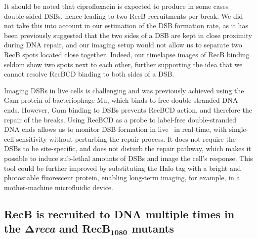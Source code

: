 It should be noted that ciprofloxacin is expected to produce in some cases double-sided DSBs, hence leading to two RecB recruitments per break. We did not take this into account in our estimation of the DSB formation rate, as it has been previously suggested that the two sides of a DSB are kept in close proximity during DNA repair\cite{Vickridge2017,Keyamura2019}, and our imaging setup would not allow us to separate two RecB spots located close together. Indeed, our timelapse images of RecB binding seldom show two spots next to each other, further supporting the idea that we cannot resolve RecBCD binding to both sides of a DSB.

Imaging DSBs in live cells is challenging and was previously achieved using the Gam protein of bacteriophage Mu, which binds to free double-stranded DNA ends\cite{Shee2013}. However, Gam binding to DSBs prevents RecBCD action, and therefore the repair of the breaks. Using RecBCD as a probe to label-free double-stranded DNA ends allows us to monitor DSB formation in live \ecoli\ in real-time, with single-cell sensitivity without perturbing the repair process. It does not require the DSBs to be site-specific, and does not disturb the repair pathway, which makes it possible to induce sub-lethal amounts of DSBs and image the cell's response. This tool could be further improved by substituting the Halo tag with a bright and photostable fluorescent protein, enabling long-term imaging, for example, in a mother-machine microfluidic device.

\subsection*{RecB is recruited to DNA multiple times in the $\mathbf{\Delta}$\emph{reca} and RecB$\mathbf{_{1080}}$ mutants}

